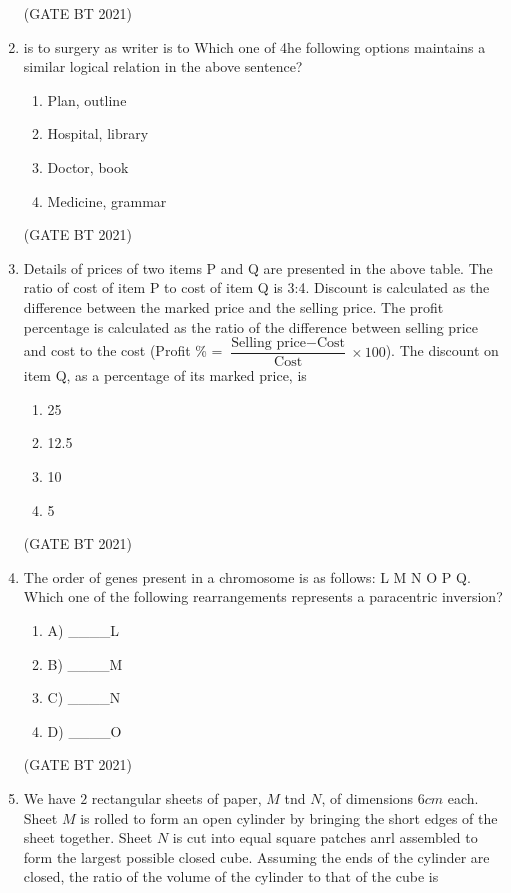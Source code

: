 \documentclass[journal,12pt,onecolumn]{IEEEtran}
\theoremstyle{remark}
\begin{document}
\begin{enumerate}
\hfill (GATE BT 2021)

\item is to surgery as writer is to 
Which one of 4he following options maintains a similar logical relation in the above sentence?

\begin{enumerate}
\item {Plan, outline}
\item {Hospital, library}
\item {Doctor, book}
\item {Medicine, grammar}
\end{enumerate}

\hfill (GATE BT 2021)
\item Details of prices of two items P and Q are presented in the above table. The ratio of cost of item P to cost of item Q is 3:4. Discount is calculated as the difference between the marked price and the selling price. The profit percentage is calculated as the ratio of the difference between selling price and cost to the cost (Profit \% = $\dfrac{\text{Selling price} - \text{Cost}}{\text{Cost}} \times 100$). The discount on item Q, as a percentage of its marked price, is
    \begin{enumerate}
        \item 25
        \item 12.5
        \item 10
        \item 5
    \end{enumerate}
\hfill (GATE BT 2021)

\item The order of genes present in a chromosome is as follows: L\; M\; N\; O\; P\; Q. Which one of the following rearrangements represents a paracentric inversion?
\begin{enumerate}
    \item A) \_\_\_\_L
    \item B) \_\_\_\_M
    \item C) \_\_\_\_N
    \item D) \_\_\_\_O
\end{enumerate}
\hfill (GATE BT 2021)



\item We have $2$ rectangular sheets of paper, $M$ tnd $N$, of dimensions $6{cm}$ each. Sheet $M$ is rolled to form an open cylinder by bringing the short edges of the sheet together. Sheet $N$ is cut into equal square patches anrl assembled to form the largest possible closed cube. Assuming the ends of the cylinder are closed, the ratio of the volume of the cylinder to that of the cube is


\end{enumerate}
\end{document}
